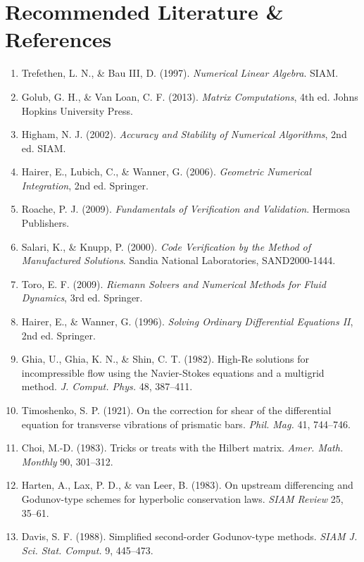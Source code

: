 \documentclass[11pt,a4paper]{report}
\begin{document}
\chapter*{Recommended Literature \& References}
\begin{enumerate}[itemsep=6pt]
    \item Trefethen, L. N., \& Bau III, D. (1997). \textit{Numerical Linear Algebra}. SIAM.
    \item Golub, G. H., \& Van Loan, C. F. (2013). \textit{Matrix Computations}, 4th ed. Johns Hopkins University Press.
    \item Higham, N. J. (2002). \textit{Accuracy and Stability of Numerical Algorithms}, 2nd ed. SIAM.
    \item Hairer, E., Lubich, C., \& Wanner, G. (2006). \textit{Geometric Numerical Integration}, 2nd ed. Springer.
    \item Roache, P. J. (2009). \textit{Fundamentals of Verification and Validation}. Hermosa Publishers.
    \item Salari, K., \& Knupp, P. (2000). \textit{Code Verification by the Method of Manufactured Solutions}. Sandia National Laboratories, SAND2000-1444.
    \item Toro, E. F. (2009). \textit{Riemann Solvers and Numerical Methods for Fluid Dynamics}, 3rd ed. Springer.
    \item Hairer, E., \& Wanner, G. (1996). \textit{Solving Ordinary Differential Equations II}, 2nd ed. Springer.
    \item Ghia, U., Ghia, K. N., \& Shin, C. T. (1982). High-Re solutions for incompressible flow using the Navier-Stokes equations and a multigrid method. \textit{J. Comput. Phys.} 48, 387--411.
    \item Timoshenko, S. P. (1921). On the correction for shear of the differential equation for transverse vibrations of prismatic bars. \textit{Phil. Mag.} 41, 744--746.
    \item Choi, M.-D. (1983). Tricks or treats with the Hilbert matrix. \textit{Amer. Math. Monthly} 90, 301--312.
    \item Harten, A., Lax, P. D., \& van Leer, B. (1983). On upstream differencing and Godunov-type schemes for hyperbolic conservation laws. \textit{SIAM Review} 25, 35--61.
    \item Davis, S. F. (1988). Simplified second-order Godunov-type methods. \textit{SIAM J. Sci. Stat. Comput.} 9, 445--473.
\end{enumerate}
\end{document}
